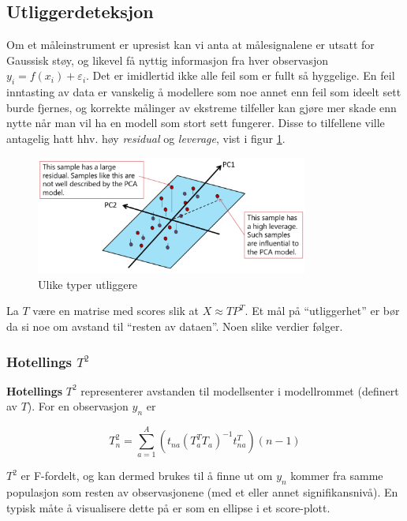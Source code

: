 \subsection{Utliggerdeteksjon}
Om et måleinstrument er upresist kan vi anta at målesignalene er utsatt for Gaussisk støy, og likevel få nyttig informasjon fra hver observasjon $y_i = f(x_i) + \varepsilon_i$. Det er imidlertid ikke alle feil som er fullt så hyggelige. En feil inntasting av data er vanskelig å modellere som noe annet enn feil som ideelt sett burde fjernes, og korrekte målinger av ekstreme tilfeller kan gjøre mer skade enn nytte når man vil ha en modell som stort sett fungerer. Disse to tilfellene ville antagelig hatt hhv. høy \textit{residual} og \textit{leverage}, vist i figur \ref{fig:utliggere}.

\begin{figure}[h]
	\centering
	\includegraphics[width=0.8\textwidth]{figurer/utligger_illustrasjon.png}
	\caption{Ulike typer utliggere}
	\label{fig:utliggere}
\end{figure}

La $T$ være en matrise med scores slik at $X \approx T P^T$. Et mål på ``utliggerhet'' er bør da si noe om avstand til ``resten av dataen''. Noen slike verdier følger.

\subsubsection{Hotellings $T^2$}
\textbf{Hotellings} $T^2$ representerer avstanden til modellsenter i modellrommet (definert av $T$). For en observasjon $y_n$ er

\begin{equation}
	T_n^2 = \sum_{a=1}^A (t_{na} (T_a ^T T_a)^{-1} t_{na}^T) (n-1)
	\label{eq:hotelling_T2}
\end{equation}

$T^2$ er F-fordelt, og kan dermed brukes til å finne ut om $y_n$ kommer fra samme populasjon som resten av observasjonene (med et eller annet signifikansnivå). En typisk måte å visualisere dette på er som en ellipse i et score-plott. 

